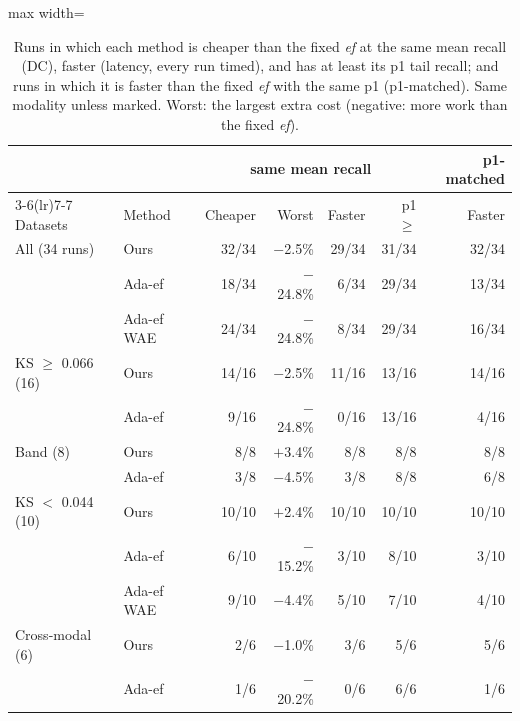 \documentclass[10pt,journal,compsoc]{IEEEtran}
\newcommand{\ef}{\textit{ef}}
\begin{document}
\begin{table}[t]
  \caption{Runs in which each method is cheaper than the fixed \ef{} at the same mean recall (DC),
  faster (latency, every run timed), and has at least its p1 tail recall; and runs in which it is
  faster than the fixed \ef{} with the same p1 (p1-matched). Same modality unless marked. Worst:
  the largest extra cost (negative: more work than the fixed \ef{}).}
  \label{tab:counts}
  \centering\footnotesize\setlength{\tabcolsep}{3.5pt}
  \begin{adjustbox}{max width=\linewidth}\begin{tabular}{llrrrrr}
    \toprule
    & & \multicolumn{4}{c}{same mean recall} & p1-matched \\
    \cmidrule(lr){3-6}\cmidrule(lr){7-7}
    Datasets & Method & Cheaper & Worst & Faster & p1 $\geq$ & Faster \\
    \midrule
    All (34 runs)        & Ours        & 32/34 & $-$2.5\%  & 29/34 & 31/34 & 32/34 \\
                         & Ada-ef      & 18/34 & $-$24.8\% &  6/34 & 29/34 & 13/34 \\
                         & Ada-ef WAE  & 24/34 & $-$24.8\% &  8/34 & 29/34 & 16/34 \\
    \midrule
    KS $\geq$ 0.066 (16) & Ours        & 14/16 & $-$2.5\%  & 11/16 & 13/16 & 14/16 \\
                         & Ada-ef      &  9/16 & $-$24.8\% &  0/16 & 13/16 &  4/16 \\
    Band (8)             & Ours        &   8/8 & $+$3.4\%  &   8/8 &   8/8 &   8/8 \\
                         & Ada-ef      &   3/8 & $-$4.5\%  &   3/8 &   8/8 &   6/8 \\
    KS $<$ 0.044 (10)    & Ours        & 10/10 & $+$2.4\%  & 10/10 & 10/10 & 10/10 \\
                         & Ada-ef      &  6/10 & $-$15.2\% &  3/10 &  8/10 &  3/10 \\
                         & Ada-ef WAE  &  9/10 & $-$4.4\%  &  5/10 &  7/10 &  4/10 \\
    \midrule
    Cross-modal (6)      & Ours        &   2/6 & $-$1.0\%  &   3/6 &   5/6 &   5/6 \\
                         & Ada-ef      &   1/6 & $-$20.2\% &   0/6 &   6/6 &   1/6 \\
    \bottomrule
  \end{tabular}\end{adjustbox}
\end{table}
\end{document}
